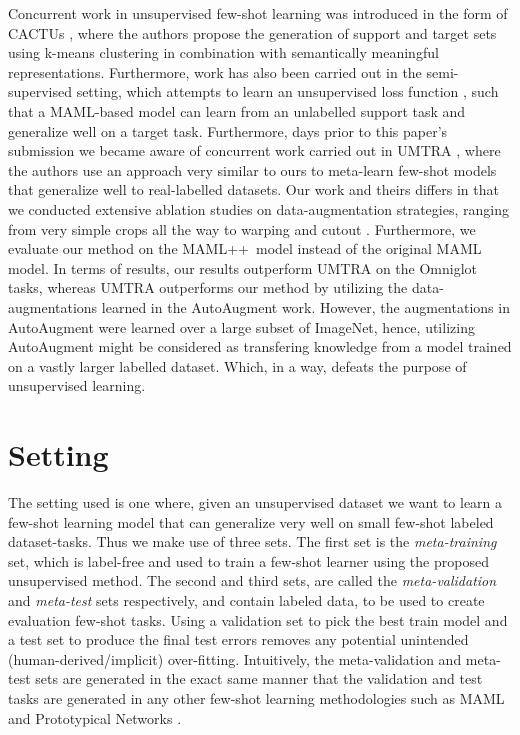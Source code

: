 \documentclass{article}
\newcommand{\maml}{MAML++}
\begin{document}
Concurrent work in unsupervised few-shot learning was introduced in the form of CACTUs \cite{hsu2018unsupervised}, where the authors propose the generation of support and target sets using k-means clustering in combination with semantically meaningful representations. Furthermore, work has also been carried out in the semi-supervised setting, which attempts to learn an unsupervised loss function \cite{semifewmaml2018}, such that a MAML-based model can learn from an unlabelled support task and generalize well on a target task. Furthermore, days prior to this paper's submission we became aware of concurrent work carried out in UMTRA \cite{unfewimagevideo}, where the authors use an approach very similar to ours to meta-learn few-shot models that generalize well to real-labelled datasets. Our work and theirs differs in that we conducted extensive ablation studies on data-augmentation strategies, ranging from very simple crops all the way to warping \cite{wong2016understanding} and cutout \cite{devries2017improved}. Furthermore, we evaluate our method on the \maml\ model instead of the original MAML model. In terms of results, our results outperform UMTRA on the Omniglot tasks, whereas UMTRA outperforms our method by utilizing the data-augmentations learned in the AutoAugment \cite{cubuk2018autoaugment} work. However, the augmentations in AutoAugment were learned over a large subset of ImageNet, hence, utilizing AutoAugment might be considered as transfering knowledge from a model trained on a vastly larger labelled dataset. Which, in a way, defeats the purpose of unsupervised learning. 


\section{Setting}\label{unmaml-setting}
The setting used is one where, given an unsupervised dataset we want to learn a few-shot learning model that can generalize very well on small few-shot labeled dataset-tasks.
Thus we make use of three sets. The first set is the \emph{meta-training} set, which is label-free and used to train a few-shot learner using the proposed unsupervised method. The second and third sets, are called the \emph{meta-validation} and \emph{meta-test} sets respectively, and contain labeled data, to be used to create evaluation few-shot tasks. Using a validation set to pick the best train model and a test set to produce the final test errors removes any potential unintended (human-derived/implicit) over-fitting. Intuitively, the meta-validation and meta-test sets are generated in the exact same manner that the validation and test tasks are generated in any other few-shot learning methodologies such as MAML \cite{finn2017model} and Prototypical Networks \cite{snell2017prototypical}.
\end{document}
